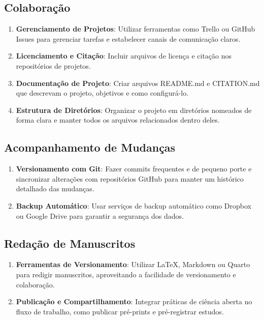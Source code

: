 \documentclass[
  a4paper,
]{article}
\providecommand{\tightlist}{%
  \setlength{\itemsep}{0pt}\setlength{\parskip}{0pt}}\usepackage{longtable,booktabs,array}
\begin{document}
\subsection{Colaboração}\label{colaborauxe7uxe3o}

\begin{enumerate}
\def\labelenumi{\arabic{enumi}.}
\tightlist
\item
  \textbf{Gerenciamento de Projetos}: Utilizar ferramentas como Trello
  ou GitHub Issues para gerenciar tarefas e estabelecer canais de
  comunicação claros.
\item
  \textbf{Licenciamento e Citação}: Incluir arquivos de licença e
  citação nos repositórios de projetos.
\item
  \textbf{Documentação de Projeto}: Criar arquivos README.md e
  CITATION.md que descrevam o projeto, objetivos e como configurá-lo.
\item
  \textbf{Estrutura de Diretórios}: Organizar o projeto em diretórios
  nomeados de forma clara e manter todos os arquivos relacionados dentro
  deles.
\end{enumerate}

\subsection{Acompanhamento de
Mudanças}\label{acompanhamento-de-mudanuxe7as}

\begin{enumerate}
\def\labelenumi{\arabic{enumi}.}
\tightlist
\item
  \textbf{Versionamento com Git}: Fazer commits frequentes e de pequeno
  porte e sincronizar alterações com repositórios GitHub para manter um
  histórico detalhado das mudanças.
\item
  \textbf{Backup Automático}: Usar serviços de backup automático como
  Dropbox ou Google Drive para garantir a segurança dos dados.
\end{enumerate}

\subsection{Redação de Manuscritos}\label{redauxe7uxe3o-de-manuscritos}

\begin{enumerate}
\def\labelenumi{\arabic{enumi}.}
\tightlist
\item
  \textbf{Ferramentas de Versionamento}: Utilizar LaTeX, Markdown ou
  Quarto para redigir manuscritos, aproveitando a facilidade de
  versionamento e colaboração.
\item
  \textbf{Publicação e Compartilhamento}: Integrar práticas de ciência
  aberta no fluxo de trabalho, como publicar pré-prints e pré-registrar
  estudos.
\end{enumerate}
\end{document}
